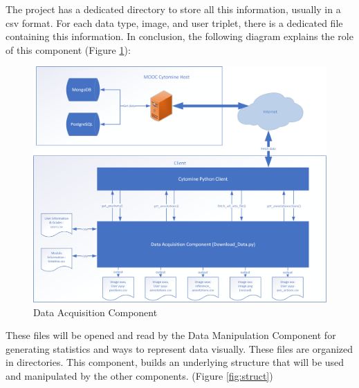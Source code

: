 \documentclass[a4paper,11pt]{report}
\numberwithin{figure}{section} %
\begin{document}
        The project has a dedicated directory to store all this information, usually in a csv format.
        For each data type, image, and user triplet, there is a dedicated file containing this information.
        In conclusion, the following diagram explains the role of this component (Figure \ref{fig:comp1}):

       \begin{figure}[H]
        \centering
         \includegraphics[width=.6\linewidth]{diagrams/module1.png}
         \caption{Data Acquisition Component}
         \label{fig:comp1}
       \end{figure}

        These files will be opened and read by the Data Manipulation Component for generating statistics and ways to represent data visually.
        These files are organized in directories.
        This component, builds an underlying structure that will be used and manipulated by the other components. (Figure \ref{fig:struct})
\end{document}
